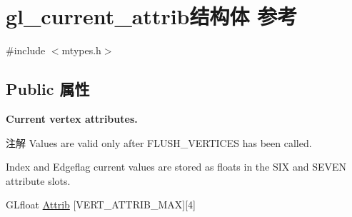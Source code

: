 \hypertarget{structgl__current__attrib}{}\section{gl\+\_\+current\+\_\+attrib结构体 参考}
\label{structgl__current__attrib}


{\ttfamily \#include $<$mtypes.\+h$>$}

\subsection*{Public 属性}
\begin{Indent}\textbf{ Current vertex attributes.}\par
{\em \begin{DoxyNote}{注解}
Values are valid only after F\+L\+U\+S\+H\+\_\+\+V\+E\+R\+T\+I\+C\+ES has been called. 

Index and Edgeflag current values are stored as floats in the S\+IX and S\+E\+V\+EN attribute slots. 
\end{DoxyNote}
}\begin{DoxyCompactItemize}
\item 
G\+Lfloat \hyperlink{structgl__current__attrib_a17764994132bfc656323d26e4d34a7fe}{Attrib} \mbox{[}V\+E\+R\+T\+\_\+\+A\+T\+T\+R\+I\+B\+\_\+\+M\+AX\mbox{]}\mbox{[}4\mbox{]}
\end{DoxyCompactItemize}
\end{Indent}
